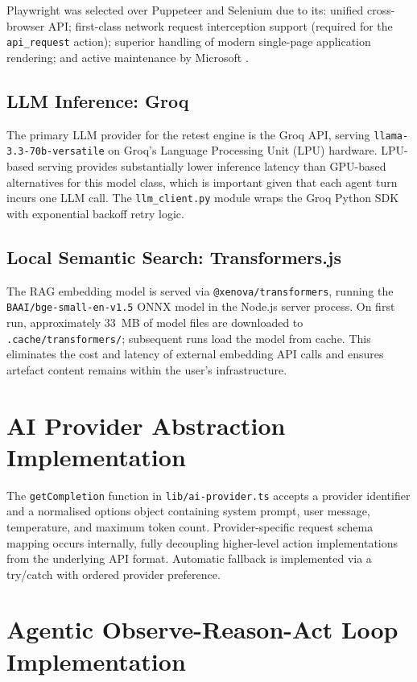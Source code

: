 Playwright was selected over Puppeteer and Selenium due to its: unified cross-browser API; first-class network request interception support (required for the \texttt{api\_request} action); superior handling of modern single-page application rendering; and active maintenance by Microsoft \cite{playwright_microsoft}.

\subsection{LLM Inference: Groq}

The primary LLM provider for the retest engine is the Groq API, serving \texttt{llama-3.3-70b-versatile} on Groq's Language Processing Unit (LPU) hardware. LPU-based serving provides substantially lower inference latency than GPU-based alternatives for this model class, which is important given that each agent turn incurs one LLM call. The \texttt{llm\_client.py} module wraps the Groq Python SDK with exponential backoff retry logic.

\subsection{Local Semantic Search: Transformers.js}

The RAG embedding model is served via \texttt{@xenova/transformers}, running the \texttt{BAAI/bge-small-en-v1.5} ONNX model in the Node.js server process. On first run, approximately 33~MB of model files are downloaded to \texttt{.cache/transformers/}; subsequent runs load the model from cache. This eliminates the cost and latency of external embedding API calls and ensures artefact content remains within the user's infrastructure.

\section{AI Provider Abstraction Implementation}

The \texttt{getCompletion} function in \texttt{lib/ai-provider.ts} accepts a provider identifier and a normalised options object containing system prompt, user message, temperature, and maximum token count. Provider-specific request schema mapping occurs internally, fully decoupling higher-level action implementations from the underlying API format. Automatic fallback is implemented via a try/catch with ordered provider preference.

\section{Agentic Observe-Reason-Act Loop Implementation}

